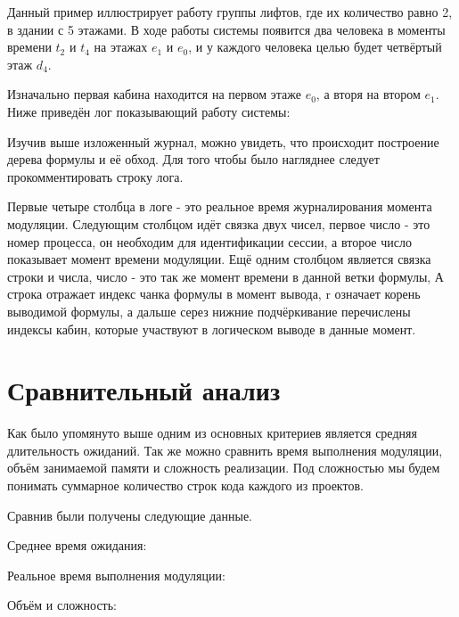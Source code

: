 	Данный пример иллюстрирует работу группы лифтов, где их количество равно 2, в здании с 5 этажами.
		В ходе работы системы появится два человека в моменты времени $t_2$ и $t_4$ на этажах $e_1$ и $e_0$,
		и у каждого человека целью будет четвёртый этаж $d_4$.

	Изначально первая кабина находится на первом этаже $e_0$, а вторя на втором $e_1$.
		Ниже приведён лог показывающий работу системы:


Изучив выше изложенный журнал, можно увидеть, что происходит построение дерева формулы и её обход.
	Для того чтобы было нагляднее следует прокомментировать строку лога.

Первые четыре столбца в логе - это реальное время журналирования момента модуляции.
	Следующим столбцом идёт связка двух чисел, первое число - это номер процесса,
	он необходим для идентификации сессии, а второе число показывает момент времени модуляции.
	Ещё одним столбцом является связка строки и числа, число - это так же момент времени в данной ветки формулы,
	А строка отражает индекс чанка формулы в момент вывода, r означает корень выводимой формулы, а дальше серез нижние подчёркивание перечислены индексы кабин, которые участвуют в логическом выводе в данные момент.

	\section{Сравнительный анализ}

	Как было упомянуто выше одним из основных критериев является средняя длительность ожиданий.
		Так же можно сравнить время выполнения модуляции, объём занимаемой памяти и сложность реализации.
		Под сложностью мы будем понимать суммарное количество строк кода каждого из проектов.

	Сравнив были получены следующие данные.

		Среднее время ожидания:

		Реальное время выполнения модуляции:

		Объём и сложность:

